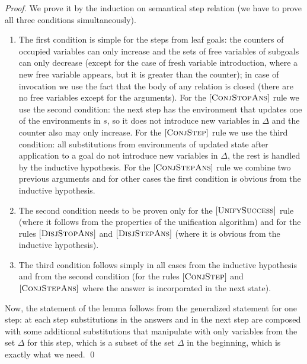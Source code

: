 \begin{proof}
We prove it by the induction on semantical step relation (we have to prove all three conditions simultaneously).

\begin{enumerate}
\item The first condition is simple for the steps from leaf goals: the counters of occupied variables can only increase and the sets of free variables of subgoals can only decrease (except for the case of fresh variable introduction, where a new free variable appears, but it is greater than the counter); in case of invocation we use the fact that the body of any relation is closed (there are no free variables except for the arguments). For the $\mbox{[\textsc{ConjStopAns}]}$ rule we use the second condition: the next step has the environment that updates one of the environments in $s$, so it does not introduce new variables in $\Delta$ and the counter also may only increase. For the $\mbox{[\textsc{ConjStep}]}$ rule we use the third condition: all substitutions from environments of updated state after application to a goal do not introduce new variables in $\Delta$, the rest is handled by the inductive hypothesis. For the $\mbox{[\textsc{ConjStepAns}]}$ rule we combine two previous arguments and for other cases the first condition is obvious from the inductive hypothesis.

\item The second condition needs to be proven only for the $\mbox{[\textsc{UnifySuccess}]}$ rule (where it follows from the properties of the unification algorithm) and for the rules $\mbox{[\textsc{DisjStopAns}]}$ and $\mbox{[\textsc{DisjStepAns}]}$ (where it is obvious from the inductive hypothesis).

\item The third condition follows simply in all cases from the inductive hypothesis and from the second condition (for the rules $\mbox{[\textsc{ConjStep}]}$ and $\mbox{[\textsc{ConjStepAns}]}$ where the answer is incorporated in the next state).
\end{enumerate}

Now, the statement of the lemma follows from the generalized statement for one step: at each step substitutions in the answers and in the next step are composed with some additional substitutions that manipulate with only variables from the set $\Delta$ for this step, which is a subset of the set $\Delta$ in the beginning, which is exactly what we need.
\qed

\end{proof}

